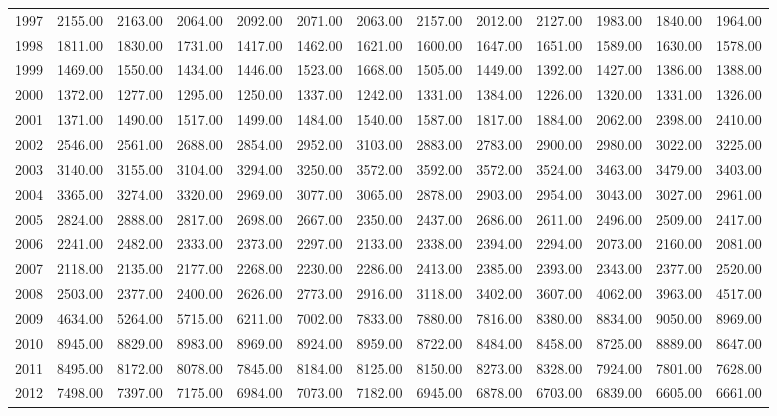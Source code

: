 \begin{longtable}{rrrrrrrrrrrrr}
  1997 & 2155.00 & 2163.00 & 2064.00 & 2092.00 & 2071.00 & 2063.00 & 2157.00 & 2012.00 & 2127.00 & 1983.00 & 1840.00 & 1964.00 \\ 
  1998 & 1811.00 & 1830.00 & 1731.00 & 1417.00 & 1462.00 & 1621.00 & 1600.00 & 1647.00 & 1651.00 & 1589.00 & 1630.00 & 1578.00 \\ 
  1999 & 1469.00 & 1550.00 & 1434.00 & 1446.00 & 1523.00 & 1668.00 & 1505.00 & 1449.00 & 1392.00 & 1427.00 & 1386.00 & 1388.00 \\ 
  2000 & 1372.00 & 1277.00 & 1295.00 & 1250.00 & 1337.00 & 1242.00 & 1331.00 & 1384.00 & 1226.00 & 1320.00 & 1331.00 & 1326.00 \\ 
  2001 & 1371.00 & 1490.00 & 1517.00 & 1499.00 & 1484.00 & 1540.00 & 1587.00 & 1817.00 & 1884.00 & 2062.00 & 2398.00 & 2410.00 \\ 
  2002 & 2546.00 & 2561.00 & 2688.00 & 2854.00 & 2952.00 & 3103.00 & 2883.00 & 2783.00 & 2900.00 & 2980.00 & 3022.00 & 3225.00 \\ 
  2003 & 3140.00 & 3155.00 & 3104.00 & 3294.00 & 3250.00 & 3572.00 & 3592.00 & 3572.00 & 3524.00 & 3463.00 & 3479.00 & 3403.00 \\ 
  2004 & 3365.00 & 3274.00 & 3320.00 & 2969.00 & 3077.00 & 3065.00 & 2878.00 & 2903.00 & 2954.00 & 3043.00 & 3027.00 & 2961.00 \\ 
  2005 & 2824.00 & 2888.00 & 2817.00 & 2698.00 & 2667.00 & 2350.00 & 2437.00 & 2686.00 & 2611.00 & 2496.00 & 2509.00 & 2417.00 \\ 
  2006 & 2241.00 & 2482.00 & 2333.00 & 2373.00 & 2297.00 & 2133.00 & 2338.00 & 2394.00 & 2294.00 & 2073.00 & 2160.00 & 2081.00 \\ 
  2007 & 2118.00 & 2135.00 & 2177.00 & 2268.00 & 2230.00 & 2286.00 & 2413.00 & 2385.00 & 2393.00 & 2343.00 & 2377.00 & 2520.00 \\ 
  2008 & 2503.00 & 2377.00 & 2400.00 & 2626.00 & 2773.00 & 2916.00 & 3118.00 & 3402.00 & 3607.00 & 4062.00 & 3963.00 & 4517.00 \\ 
  2009 & 4634.00 & 5264.00 & 5715.00 & 6211.00 & 7002.00 & 7833.00 & 7880.00 & 7816.00 & 8380.00 & 8834.00 & 9050.00 & 8969.00 \\ 
  2010 & 8945.00 & 8829.00 & 8983.00 & 8969.00 & 8924.00 & 8959.00 & 8722.00 & 8484.00 & 8458.00 & 8725.00 & 8889.00 & 8647.00 \\ 
  2011 & 8495.00 & 8172.00 & 8078.00 & 7845.00 & 8184.00 & 8125.00 & 8150.00 & 8273.00 & 8328.00 & 7924.00 & 7801.00 & 7628.00 \\ 
  2012 & 7498.00 & 7397.00 & 7175.00 & 6984.00 & 7073.00 & 7182.00 & 6945.00 & 6878.00 & 6703.00 & 6839.00 & 6605.00 & 6661.00 \\ 

\end{longtable}
